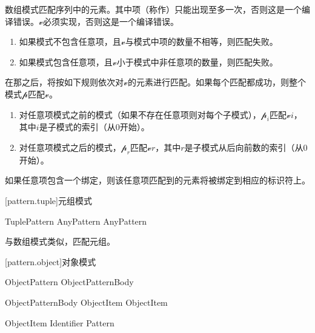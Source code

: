 \pnum
数组模式匹配序列中的元素。其中项（称作）只能出现至多一次，否则这是一个编译错误。$\mathcal{v}$必须实现，否则这是一个编译错误。

\begin{enumerate}
    \item 如果模式不包含任意项，且$\mathcal{v}$与模式中项的数量不相等，则匹配失败。
    \item 如果模式包含任意项，且$\mathcal{v}$小于模式中非任意项的数量，则匹配失败。
\end{enumerate}

\pnum
在那之后，将按如下规则依次对$\mathcal{v}$的元素进行匹配。如果每个匹配都成功，则整个模式$\mathcal{p}$匹配$\mathcal{v}$。

\begin{enumerate}
    \item 对任意项模式之前的模式（如果不存在任意项则对每个子模式），$\mathcal{p}_i$匹配$\mathcal{v}$\tcode{[}$i$\tcode{]}，其中$i$是子模式的索引（从0开始）。
    \item 对任意项模式之后的模式，$\mathcal{p}_r$匹配$\mathcal{v}$\tcode{[\$-}$r$\tcode{]}，其中$r$是子模式从后向前数的索引（从0开始）。
\end{enumerate}

\pnum
如果任意项包含一个绑定，则该任意项匹配到的元素将被绑定到相应的标识符上。

[pattern.tuple]{元组模式}

\begin{bnf}{TuplePattern}
    \terminal{(} AnyPattern \bnflp\terminal{,} AnyPattern\bnfrp\bnfs\ \terminal{)}
\end{bnf}

\pnum
与数组模式类似，匹配元组。

[pattern.object]{对象模式}

\begin{bnf}{ObjectPattern}
    \terminal{\{} ObjectPatternBody \terminal{\}}
\end{bnf}

\begin{bnf}{ObjectPatternBody}
    ObjectItem \bnflp\terminal{,} ObjectItem\bnfrp\bnfs
\end{bnf}

\begin{bnf}{ObjectItem}
    Identifier \terminal{:} Pattern
\end{bnf}

